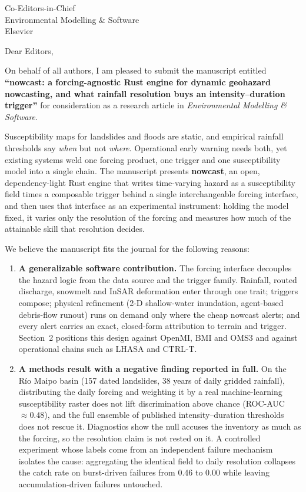 \documentclass[11pt]{letter}
\date{\today}
\begin{document}
\begin{letter}{Co-Editors-in-Chief\\
Environmental Modelling \& Software\\
Elsevier}

\opening{Dear Editors,}

On behalf of all authors, I am pleased to submit the manuscript entitled
\textbf{``nowcast: a forcing-agnostic Rust engine for dynamic geohazard
nowcasting, and what rainfall resolution buys an intensity--duration trigger''} for consideration as a
research article in \textit{Environmental Modelling \& Software}.

Susceptibility maps for landslides and floods are static, and empirical rainfall
thresholds say \emph{when} but not \emph{where}. Operational early warning needs
both, yet existing systems weld one forcing product, one trigger and one
susceptibility model into a single chain. The manuscript presents
\textbf{nowcast}, an open, dependency-light Rust engine that writes time-varying
hazard as a susceptibility field times a composable trigger behind a single
interchangeable forcing interface, and then uses that interface as an
experimental instrument: holding the model fixed, it varies only the resolution
of the forcing and measures how much of the attainable skill that resolution
decides.

We believe the manuscript fits the journal for the following reasons:

\begin{enumerate}
    \item \textbf{A generalizable software contribution.} The forcing interface
    decouples the hazard logic from the data source and the trigger family.
    Rainfall, routed discharge, snowmelt and InSAR deformation enter through one
    trait; triggers compose; physical refinement (2-D shallow-water inundation,
    agent-based debris-flow runout) runs on demand only where the cheap nowcast
    alerts; and every alert carries an exact, closed-form attribution to terrain
    and trigger. Section~2 positions this design against OpenMI, BMI and OMS3 and
    against operational chains such as LHASA and CTRL-T.

    \item \textbf{A methods result with a negative finding reported in full.}
    On the R\'io Maipo basin (157 dated landslides, 38 years of daily gridded
    rainfall), distributing the daily forcing and weighting it by a real
    machine-learning susceptibility raster does not lift discrimination above
    chance (ROC-AUC $\approx 0.48$), and the full ensemble of published
    intensity--duration thresholds does not rescue it. Diagnostics show the
    null accuses the inventory as much as the forcing, so the resolution claim
    is not rested on it. A controlled experiment whose labels come from an
    independent failure mechanism isolates the cause: aggregating the identical
    field to daily resolution collapses the catch rate on burst-driven failures
    from 0.46 to 0.00 while leaving accumulation-driven failures untouched.


\end{enumerate}
\end{letter}
\end{document}
